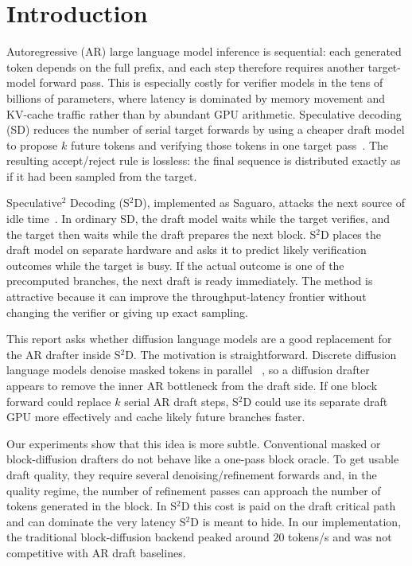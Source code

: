 \section{Introduction}
\label{sec:intro}

Autoregressive (AR) large language model inference is sequential: each
generated token depends on the full prefix, and each step therefore requires
another target-model forward pass. This is especially costly for verifier
models in the tens of billions of parameters, where latency is dominated by
memory movement and KV-cache traffic rather than by abundant GPU arithmetic.
Speculative decoding (SD) reduces the number of serial target forwards by
using a cheaper draft model to propose $k$ future tokens and verifying those
tokens in one target pass~\cite{leviathan2023, chen2023}. The resulting
accept/reject rule is lossless: the final sequence is distributed exactly as
if it had been sampled from the target.

Speculative$^2$ Decoding (S$^2$D), implemented as Saguaro, attacks the next
source of idle time~\cite{saguaro2024}. In ordinary SD, the draft model waits
while the target verifies, and the target then waits while the draft prepares
the next block. S$^2$D places the draft model on separate hardware and asks it
to predict likely verification outcomes while the target is busy. If the
actual outcome is one of the precomputed branches, the next draft is ready
immediately. The method is attractive because it can improve the
throughput-latency frontier without changing the verifier or giving up exact
sampling.

This report asks whether diffusion language models are a good replacement for
the AR drafter inside S$^2$D. The motivation is straightforward. Discrete
diffusion language models denoise masked tokens in parallel
~\cite{sahoo2024, arriola2025}, so a diffusion drafter appears to remove the
inner AR bottleneck from the draft side. If one block forward could replace
$k$ serial AR draft steps, S$^2$D could use its separate draft GPU more
effectively and cache likely future branches faster.

Our experiments show that this idea is more subtle. Conventional masked or
block-diffusion drafters do not behave like a one-pass block oracle. To get
usable draft quality, they require several denoising/refinement forwards and,
in the quality regime, the number of refinement passes can approach the number
of tokens generated in the block. In S$^2$D this cost is paid on the draft
critical path and can dominate the very latency S$^2$D is meant to hide. In
our implementation, the traditional block-diffusion backend peaked around
$20$ tokens/s and was not competitive with AR draft baselines.

